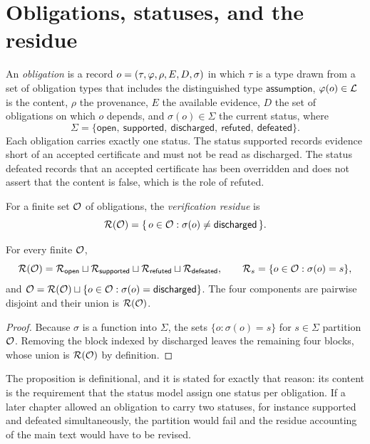 \section{Obligations, statuses, and the residue}

\begin{definition}[Obligation]
An \emph{obligation} is a record $o = (\tau, \varphi, \rho, E, D, \sigma)$ in which $\tau$ is a type drawn from a set of obligation types that includes the distinguished type $\mathsf{assumption}$, $\varphi(o) \in \mathcal{L}$ is the content, $\rho$ the provenance, $E$ the available evidence, $D$ the set of obligations on which $o$ depends, and $\sigma(o) \in \Sigma$ the current status, where
\[
\Sigma = \{\mathsf{open},\ \mathsf{supported},\ \mathsf{discharged},\ \mathsf{refuted},\ \mathsf{defeated}\}.
\]
Each obligation carries exactly one status. The status \textsf{supported} records evidence short of an accepted certificate and must not be read as \textsf{discharged}. The status \textsf{defeated} records that an accepted certificate has been overridden and does not assert that the content is false, which is the role of \textsf{refuted}.
\end{definition}

\begin{definition}[Residue]
For a finite set $\mathcal{O}$ of obligations, the \emph{verification residue} is
\[
\mathcal{R}(\mathcal{O}) = \{\, o \in \mathcal{O} : \sigma(o) \neq \mathsf{discharged} \,\}.
\]
\end{definition}

\begin{proposition}
\label{prop:partition}
For every finite $\mathcal{O}$,
\[
\mathcal{R}(\mathcal{O}) = \mathcal{R}_{\mathsf{open}} \sqcup \mathcal{R}_{\mathsf{supported}} \sqcup \mathcal{R}_{\mathsf{refuted}} \sqcup \mathcal{R}_{\mathsf{defeated}},
\qquad
\mathcal{R}_s = \{ o \in \mathcal{O} : \sigma(o) = s \},
\]
and $\mathcal{O} = \mathcal{R}(\mathcal{O}) \sqcup \{ o \in \mathcal{O} : \sigma(o) = \mathsf{discharged}\}$. The four components are pairwise disjoint and their union is $\mathcal{R}(\mathcal{O})$.
\end{proposition}

\begin{proof}
Because $\sigma$ is a function into $\Sigma$, the sets $\{o : \sigma(o) = s\}$ for $s \in \Sigma$ partition $\mathcal{O}$. Removing the block indexed by \textsf{discharged} leaves the remaining four blocks, whose union is $\mathcal{R}(\mathcal{O})$ by definition.
\end{proof}

The proposition is definitional, and it is stated for exactly that reason: its content is the requirement that the status model assign one status per obligation. If a later chapter allowed an obligation to carry two statuses, for instance \textsf{supported} and \textsf{defeated} simultaneously, the partition would fail and the residue accounting of the main text would have to be revised.

